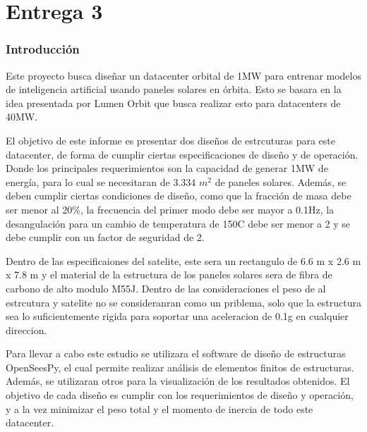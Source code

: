 \part{Entrega 3}

\section{Introducción}

Este proyecto busca diseñar un datacenter orbital de 1MW para entrenar modelos de inteligencia artificial usando paneles solares en órbita. Esto se basara en la idea presentada por Lumen Orbit que busca realizar esto para datacenters de 40MW.

El objetivo de este informe es presentar dos diseños de estrcuturas para este datacenter, de forma de cumplir ciertas especificaciones de diseño y de operación. Donde los principales requerimientos son la capacidad de generar 1MW de energía, para lo cual se necesitaran de 3.334 $m^2$ de paneles solares. Además, se deben cumplir ciertas condiciones de diseño, como que la fracción de masa debe ser menor al 20\%, la frecuencia del primer modo debe ser mayor a 0.1Hz, la desangulación para un cambio de temperatura de 150\textdegree{}C debe ser menor a 2\textdegree{} y se debe cumplir con un factor de seguridad de 2.

Dentro de las especificaiones del satelite, este sera un rectangulo de 6.6 m x 2.6 m x 7.8 m y el material de la estructura de los paneles solares sera de fibra de carbono de alto modulo M55J. Dentro de las consideraciones el peso de al estrcutura y satelite no se consideranran como un priblema, solo que la estructura sea lo suficientemente rigida para soportar una aceleracion de 0.1g en cualquier direccion. 

Para llevar a cabo este estudio se utilizara el software de diseño de estructuras OpenSeesPy, el cual permite realizar análisis de elementos finitos de estructuras. Además, se utilizaran otros para la visualización de los resultados obtenidos. El objetivo de cada diseño es cumplir con los requerimientos de diseño y operación, y a la vez minimizar el peso total y el momento de inercia de todo este datacenter.